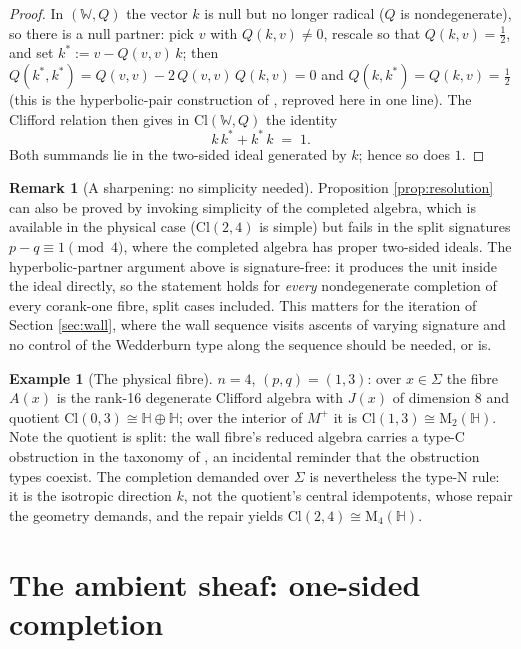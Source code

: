 \documentclass[11pt]{article}
\theoremstyle{definition}
\newtheorem{remark}[theorem]{Remark}
\newtheorem{example}[theorem]{Example}
\newcommand{\Cl}{\mathrm{Cl}}
\newcommand{\HH}{\mathbb{H}}
\newcommand{\Mat}{\mathrm{M}}
\newcommand{\Sig}{\Sigma}
\newcommand{\Mp}{M^{+}}
\begin{document}
\begin{proof}
In $(\mathbb{W}, Q)$ the vector $k$ is null but no longer radical ($Q$ is nondegenerate), so there is a null partner: pick $v$ with $Q(k, v) \neq 0$, rescale so that $Q(k,v) = \tfrac12$, and set $k^* := v - Q(v,v)\,k$; then $Q(k^*, k^*) = Q(v,v) - 2\,Q(v,v)\,Q(k,v) = 0$ and $Q(k, k^*) = Q(k,v) = \tfrac12$ (this is the hyperbolic-pair construction of \cite[\S 2.2]{ButlerT1}, reproved here in one line). The Clifford relation then gives in $\Cl(\mathbb{W}, Q)$ the identity
\[
k\,k^* + k^*\,k \;=\; 1 .
\]
Both summands lie in the two-sided ideal generated by $k$; hence so does $1$.
\end{proof}

\begin{remark}[A sharpening: no simplicity needed]\label{rem:sharpening}
Proposition \ref{prop:resolution} can also be proved by invoking simplicity of the completed algebra, which is available in the physical case ($\Cl(2,4)$ is simple) but fails in the split signatures $p - q \equiv 1 \pmod 4$, where the completed algebra has proper two-sided ideals. The hyperbolic-partner argument above is signature-free: it produces the unit inside the ideal directly, so the statement holds for \emph{every} nondegenerate completion of every corank-one fibre, split cases included. This matters for the iteration of Section \ref{sec:wall}, where the wall sequence visits ascents of varying signature and no control of the Wedderburn type along the sequence should be needed, or is.
\end{remark}

\begin{example}[The physical fibre]\label{ex:physical}
$n = 4$, $(p,q) = (1,3)$: over $x \in \Sig$ the fibre $A(x)$ is the rank-16 degenerate Clifford algebra with $J(x)$ of dimension 8 and quotient $\Cl(0,3) \cong \HH \oplus \HH$; over the interior of $\Mp$ it is $\Cl(1,3) \cong \Mat_2(\HH)$. Note the quotient is split: the wall fibre's reduced algebra carries a type-C obstruction in the taxonomy of \cite{ButlerT1}, an incidental reminder that the obstruction types coexist. The completion demanded over $\Sig$ is nevertheless the type-N rule: it is the isotropic direction $k$, not the quotient's central idempotents, whose repair the geometry demands, and the repair yields $\Cl(2,4) \cong \Mat_4(\HH)$.
\end{example}

\section{The ambient sheaf: one-sided completion}\label{sec:ambient}
\end{document}

